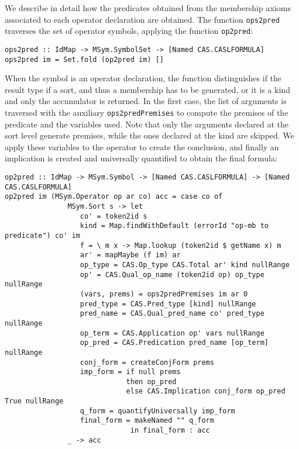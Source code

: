 We describe in detail how the predicates obtained from the membership
axioms associated to each operator declaration are obtained. The function
\verb"ops2pred" traverses the set of operator symbols, applying
the function \verb"op2pred":

{\codesize
\begin{verbatim}
ops2pred :: IdMap -> MSym.SymbolSet -> [Named CAS.CASLFORMULA]
ops2pred im = Set.fold (op2pred im) []
\end{verbatim}
}

When the symbol is an operator declaration, the function distinguishes
if the result type if a sort, and thus a membership has to be generated,
or it is a kind and only the accumulator is returned. In the first
case, the list of arguments is traversed with the auxiliary
\verb"ops2predPremises" to compute the premises of the predicate
and the variables used. Note that only the arguments declared at the
sort level generate premises, while the ones declared at the kind 
are skipped. We apply these variables to the operator to create the
conclusion, and finally an implication is created and universally
quantified to obtain the final formula:

{\codesize
\begin{verbatim}
op2pred :: IdMap -> MSym.Symbol -> [Named CAS.CASLFORMULA] -> [Named CAS.CASLFORMULA]
op2pred im (MSym.Operator op ar co) acc = case co of
               MSym.Sort s -> let 
                  co' = token2id s
                  kind = Map.findWithDefault (errorId "op-mb to predicate") co' im
                  f = \ m x -> Map.lookup (token2id $ getName x) m
                  ar' = mapMaybe (f im) ar
                  op_type = CAS.Op_type CAS.Total ar' kind nullRange
                  op' = CAS.Qual_op_name (token2id op) op_type nullRange
                  (vars, prems) = ops2predPremises im ar 0
                  pred_type = CAS.Pred_type [kind] nullRange
                  pred_name = CAS.Qual_pred_name co' pred_type nullRange
                  op_term = CAS.Application op' vars nullRange
                  op_pred = CAS.Predication pred_name [op_term] nullRange
                  conj_form = createConjForm prems
                  imp_form = if null prems
                             then op_pred
                             else CAS.Implication conj_form op_pred True nullRange
                  q_form = quantifyUniversally imp_form
                  final_form = makeNamed "" q_form
                              in final_form : acc
               _ -> acc
\end{verbatim}
}

